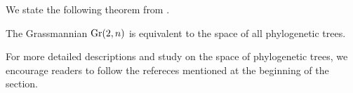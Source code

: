         We state the following theorem from \citet{Dukkipati2013}.
        \begin{theorem}
            The Grassmannian $\operatorname{Gr}(2, n)$ is equivalent to the space of all phylogenetic trees. 
        \end{theorem}
        For more detailed descriptions and study on the space of phylogenetic trees, we encourage readers to follow the refereces mentioned at the beginning of the section. 
        
        
        
        
        
        
            
            
            
            
            
            
            
            
            
            
        
        
        
        
        
        
        
        
        
        
        
        
        
        
        
    
    
    
    
    
    
    
    
    
    
    
    
    